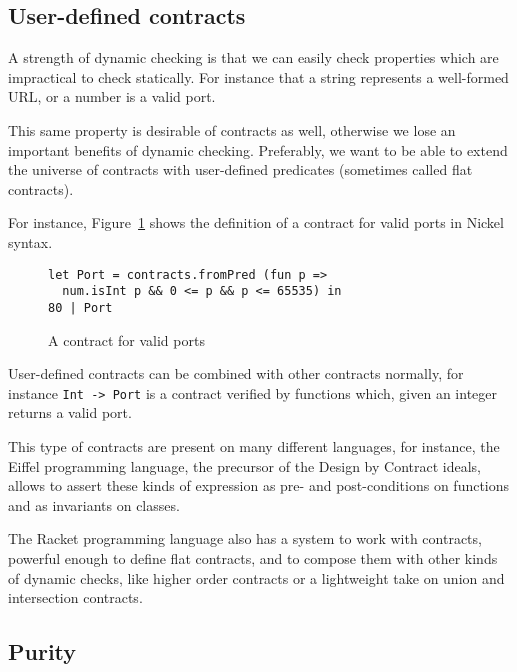\documentclass[sigplan,10pt,review,anonymous]{acmart}
\newcommand{\info}[2][1=]{}
\newcommand{\nickel}[1]{\lstinline[language=nickel]{#1}}
\begin{document}
\subsection{User-defined contracts}
\label{sec:flat-contracts}

A strength of dynamic checking is that we can easily check properties which
are impractical to check statically. For instance that a string
represents a well-formed URL, or a number is a valid port.

This same property is desirable of contracts as well, otherwise we
lose an important benefits of dynamic checking. Preferably, we want to
be able to extend the universe of contracts with user-defined
predicates (sometimes called flat contracts).

For instance, Figure~\ref{fig:port-contract} shows the definition of a
contract for valid ports in Nickel syntax.

\begin{figure}[h]
  \begin{center}
\begin{lstlisting}[language=nickel]
let Port = contracts.fromPred (fun p =>
  num.isInt p && 0 <= p && p <= 65535) in
80 | Port
\end{lstlisting}
\end{center}
\caption{A contract for valid ports}
\label{fig:port-contract}
\end{figure}

User-defined contracts can be combined with other contracts normally,
for instance \nickel{Int -> Port} is a contract verified by functions
which, given an integer returns a valid port.

This type of contracts are present on many different languages,
for instance, the Eiffel programming language\cite{meyer1987eiffel}, the precursor
of the Design by Contract ideals, allows to assert
these kinds of expression as pre- and post-conditions on
functions and as invariants on classes\cite{EiffelDesignByContract}.

The Racket programming language also has a system to work with
contracts, powerful enough to define flat contracts, and
to compose them with other kinds of dynamic checks,
like higher order contracts or a lightweight take on union
and intersection contracts\cite{RacketContracts}.


\subsection{Purity}
\label{sec:optimizations}
\info{Present inlining and CSE as two major code
optimizations.
Purity and immutability as two important factors.}
\end{document}
